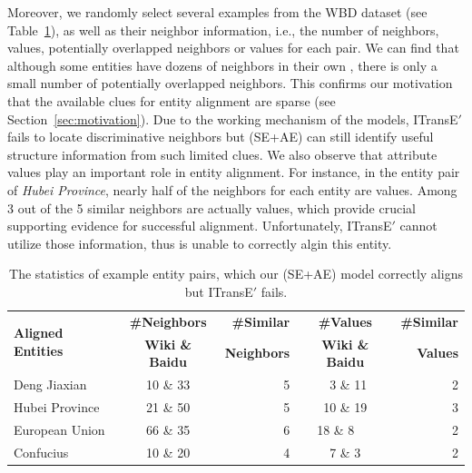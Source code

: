Moreover, we randomly select several examples from the WBD dataset (see Table~\ref{example}), as well as their neighbor information, i.e.,
the number of neighbors, values, potentially overlapped neighbors or values for each pair. We can find that although some entities have
dozens of neighbors in their own \KGs,  there is only a small number of potentially overlapped neighbors. This confirms our motivation that
the available clues for entity alignment are sparse (see Section~\ref{sec:motivation}). Due to the working mechanism of the models,
  ITransE$'$ fails to locate discriminative neighbors but \HRGCN (SE+AE) can still identify useful structure information from such limited clues.
We also observe that attribute values play an important role in entity alignment. For instance, in the entity pair of \textit{Hubei
Province}, nearly half of the neighbors for each entity are values. Among 3 out of the 5 similar neighbors are actually values, which
provide crucial supporting evidence for successful alignment. Unfortunately, ITransE$'$ cannot utilize those information, thus is unable to
correctly algin this entity.

\begin{table}
	\centering
	\scriptsize
	\begin{tabular}{lcrcr}
		\toprule
		\multirow{2}{*}{\bf Aligned Entities} & \bf \#Neighbors & \bf \#Similar & \bf \#Values & \bf \#Similar \\
		&\bf  Wiki \& Baidu &\bf  Neighbors &\bf  Wiki \& Baidu &\bf  Values \\
		\midrule
		Deng Jiaxian & 10 \& 33 & 5 & \ 3 \& 11 & 2\\
		Hubei Province & 21 \& 50 & 5 & 10 \& 19 & 3\\
		European Union & 66 \& 35 & 6 & 18 \& 8\ \ \ & 2\\
		Confucius & 10 \& 20 & 4 & 7 \& 3 & 2\\
		\bottomrule
	\end{tabular}
	\caption{The statistics of example entity pairs, which our \HRGCN(SE+AE) model correctly aligns but ITransE$'$ fails.}
	\label{example}
\end{table}


